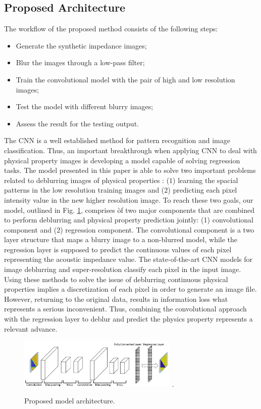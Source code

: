 \documentclass[conference]{IEEEtran}
\begin{document}
\subsection{Proposed Architecture}
The workflow of the proposed method consists of the following
steps:
\begin{itemize}
 \item Generate the synthetic impedance images;
 \item Blur the images through a low-pass filter;
 \item Train the convolutional model with the pair of high and low resolution images;
 \item Test the model with different blurry images;
 \item Assess the result for the testing output.
\end{itemize}

The CNN is a well established method for
pattern recognition and image classification.
Thus, an important breakthrough when applying CNN to
deal with physical property images is developing a model
capable of solving regression tasks. The model presented in this paper
is able to solve two important problems related to deblurring  images of physical properties
: ($1$) learning the spacial patterns in the low resolution
training images and ($2$) predicting each pixel intensity value in the new
higher resolution image. To reach these two goals, our model, outlined in Fig. \ref{fig_model},
comprises òf two major components that are combined to perform deblurring and physical property prediction
jointly: (1) convolutional component and (2) regression component. The convolutional component
is a two layer structure that maps a blurry image to a non-blurred model, while 
the regression layer is supposed to predict the continuous values of each pixel
representing the acoustic impedance value. 
The state-of-the-art CNN models for image deblurring \cite{Grigorios2017} and super-resolution \cite{Dahl2017}
classify each pixel in the input image. 
Using these methods to solve the issue of deblurring continuous physical properties 
implies a discretization of each pixel in order to generate an image file. However, returning
to the original data, results in information loss what represents a serious inconvenient.
Thus, combining the convolutional approach with the regression layer to deblur and predict
the physics property represents a relevant advance.
\begin{figure}[!t]
\centering
\includegraphics[width=3.0in]{Figs/model}
\DeclareGraphicsExtensions.
\caption{Proposed model architecture.}
\label{fig_model}
\end{figure}
\end{document}
